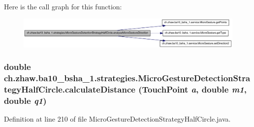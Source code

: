 Here is the call graph for this function:\nopagebreak
\begin{figure}[H]
\begin{center}
\leavevmode
\includegraphics[width=412pt]{classch_1_1zhaw_1_1ba10__bsha__1_1_1strategies_1_1MicroGestureDetectionStrategyHalfCircle_abc630df3a07afe93dacdc0fc3c788607_cgraph}
\end{center}
\end{figure}
\hypertarget{classch_1_1zhaw_1_1ba10__bsha__1_1_1strategies_1_1MicroGestureDetectionStrategyHalfCircle_a41f906c4c42a57ac8d1c6ae417fe6578}{
\subsubsection[{calculateDistance}]{\setlength{\rightskip}{0pt plus 5cm}double ch.zhaw.ba10\_\-bsha\_\-1.strategies.MicroGestureDetectionStrategyHalfCircle.calculateDistance ({\bf TouchPoint} {\em a}, \/  double {\em m1}, \/  double {\em q1})}}
\label{classch_1_1zhaw_1_1ba10__bsha__1_1_1strategies_1_1MicroGestureDetectionStrategyHalfCircle_a41f906c4c42a57ac8d1c6ae417fe6578}


Definition at line 210 of file MicroGestureDetectionStrategyHalfCircle.java.

